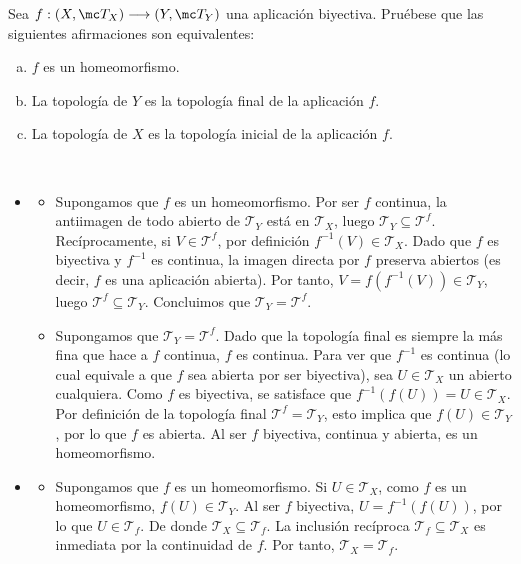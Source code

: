 \begin{ejer}
    [97] Sea $f: (X, \mc T_X) \longrightarrow (Y, \mc T_Y)$ una aplicación biyectiva. Pruébese que las siguientes afirmaciones son equivalentes:
    \begin{enumerate}[a)]
        \item $f$ es un homeomorfismo.
        \item La topología de $Y$ es la topología final de la aplicación $f$.
        \item La topología de $X$ es la topología inicial de la aplicación $f$.
    \end{enumerate}
\end{ejer}
\begin{sol} \,
    \begin{itemize}
        \item [$a) \iff b)$] 
        \begin{itemize}
            \item [$(\Rightarrow)$] Supongamos que $f$ es un homeomorfismo. Por ser $f$ continua, la antiimagen de todo abierto de $\mathcal{T}_Y$ está en $\mathcal{T}_X$, luego $\mathcal{T}_Y \subseteq \mathcal{T}^f$. Recíprocamente, si $V \in \mathcal{T}^f$, por definición $f^{-1}(V) \in \mathcal{T}_X$. Dado que $f$ es biyectiva y $f^{-1}$ es continua, la imagen directa por $f$ preserva abiertos (es decir, $f$ es una aplicación abierta). Por tanto, $V = f(f^{-1}(V)) \in \mathcal{T}_Y$, luego $\mathcal{T}^f \subseteq \mathcal{T}_Y$. Concluimos que $\mathcal{T}_Y = \mathcal{T}^f$.

            \item [$(\Leftarrow)$] Supongamos que $\mathcal{T}_Y = \mathcal{T}^f$. Dado que la topología final es siempre la más fina que hace a $f$ continua, $f$ es continua. Para ver que $f^{-1}$ es continua (lo cual equivale a que $f$ sea abierta por ser biyectiva), sea $U \in \mathcal{T}_X$ un abierto cualquiera. Como $f$ es biyectiva, se satisface que $f^{-1}(f(U)) = U \in \mathcal{T}_X$. Por definición de la topología final $\mathcal{T}^f = \mathcal{T}_Y$, esto implica que $f(U) \in \mathcal{T}_Y$, por lo que $f$ es abierta. Al ser $f$ biyectiva, continua y abierta, es un homeomorfismo.
        \end{itemize}

        \item [$a) \iff c)$] 
        \begin{itemize}
            \item [$(\Rightarrow)$] Supongamos que $f$ es un homeomorfismo. Si $U \in \mathcal{T}_X$, como $f$ es un homeomorfismo, $f(U) \in \mathcal{T}_Y$. Al ser $f$ biyectiva, $U = f^{-1}(f(U))$, por lo que $U \in \mathcal{T}_f$. De donde $\mathcal{T}_X \subseteq \mathcal{T}_f$. La inclusión recíproca $\mathcal{T}_f \subseteq \mathcal{T}_X$ es inmediata por la continuidad de $f$. Por tanto, $\mathcal{T}_X = \mathcal{T}_f$.


\end{itemize}
\end{itemize}
\end{sol}
